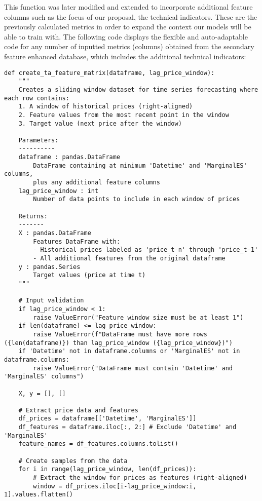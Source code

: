 \documentclass[12pt]{report} %
\begin{document}
This function was later modified and extended to incorporate additional feature columns such as the focus of our proposal, the technical indicators. These are the previously calculated metrics in order to expand the context our models will be able to train with. The following code displays the flexible and auto-adaptable code for any number of inputted metrics (columns) obtained from the secondary feature enhanced database, which includes the additional technical indicators:
\begin{lstlisting}
def create_ta_feature_matrix(dataframe, lag_price_window):
    """
    Creates a sliding window dataset for time series forecasting where each row contains:
    1. A window of historical prices (right-aligned)
    2. Feature values from the most recent point in the window
    3. Target value (next price after the window)
    
    Parameters:
    ----------
    dataframe : pandas.DataFrame
        DataFrame containing at minimum 'Datetime' and 'MarginalES' columns, 
        plus any additional feature columns
    lag_price_window : int
        Number of data points to include in each window of prices
        
    Returns:
    -------
    X : pandas.DataFrame
        Features DataFrame with:
        - Historical prices labeled as 'price_t-n' through 'price_t-1'
        - All additional features from the original dataframe
    y : pandas.Series
        Target values (price at time t)
    """
    
    # Input validation
    if lag_price_window < 1:
        raise ValueError("Feature window size must be at least 1")
    if len(dataframe) <= lag_price_window:
        raise ValueError(f"DataFrame must have more rows ({len(dataframe)}) than lag_price_window ({lag_price_window})")
    if 'Datetime' not in dataframe.columns or 'MarginalES' not in dataframe.columns:
        raise ValueError("DataFrame must contain 'Datetime' and 'MarginalES' columns")

    X, y = [], []
    
    # Extract price data and features
    df_prices = dataframe[['Datetime', 'MarginalES']]
    df_features = dataframe.iloc[:, 2:] # Exclude 'Datetime' and 'MarginalES'
    feature_names = df_features.columns.tolist()

    # Create samples from the data
    for i in range(lag_price_window, len(df_prices)):
        # Extract the window for prices as features (right-aligned)
        window = df_prices.iloc[i-lag_price_window:i, 1].values.flatten()
        

\end{lstlisting}
\end{document}
